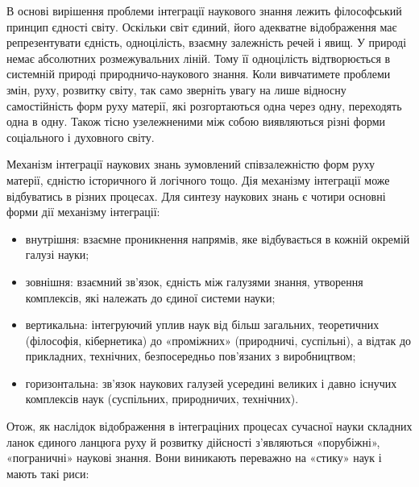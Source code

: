 В основі вирішення проблеми інтеграції наукового знання лежить
філософський принцип єдності світу. Оскільки світ єдиний, його адекватне
відображення має репрезентувати єдність, одноцілість, взаємну залежність
речей і явищ. У природі немає абсолютних розмежувальних ліній. Тому її
одноцілість відтворюється в системній природі природничо-наукового знання.
Коли вивчатимете проблеми змін, руху, розвитку світу, так само зверніть увагу
на лише відносну самостійність форм руху матерії, які розгортаються одна
через одну, переходять одна в одну. Також тісно узележненими між собою
виявляються різні форми соціального і духовного світу.

Механізм інтеграції наукових знань зумовлений співзалежністю форм руху
матерії, єдністю історичного й логічного тощо. Дія механізму інтеграції може
відбуватись в різних процесах. Для синтезу наукових знань є чотири основні
форми дії механізму інтеграції:
\begin{itemize}
	\item внутрішня: взаємне проникнення напрямів, яке відбувається в кожній
	окремій галузі науки;

	\item зовнішня: взаємний зв’язок, єдність між галузями знання, утворення
	комплексів, які належать до єдиної системи науки;

	\item вертикальна: інтегруючий уплив наук від більш загальних, теоретичних
	(філософія, кібернетика) до «проміжних» (природничі, суспільні), а відтак до
	прикладних, технічних, безпосередньо пов’язаних з виробництвом;
	
	\item горизонтальна: зв’язок наукових галузей усередині великих і давно
	існучих комплексів наук (суспільних, природничих, технічних).
\end{itemize}

Отож, як наслідок відображення в інтеграціних процесах сучасної науки
складних ланок єдиного ланцюга руху й розвитку дійсності з’являються
«порубіжні», «пограничні» наукові знання. Вони виникають переважно на
«стику» наук і мають такі риси:

